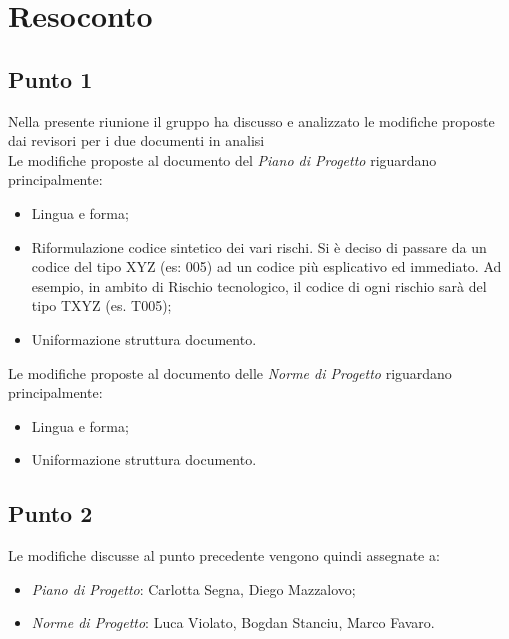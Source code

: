 \section{Resoconto}

\subsection{Punto 1}
Nella presente riunione il gruppo ha discusso e analizzato le modifiche proposte dai revisori per i due documenti in analisi\\
Le modifiche proposte al documento del \textit{Piano di Progetto} riguardano principalmente:
\begin{itemize}
	\item Lingua e forma;
	\item Riformulazione codice sintetico dei vari rischi. Si è deciso di passare da un codice del tipo XYZ (es: 005) ad un codice più esplicativo ed immediato. Ad esempio, in ambito di Rischio tecnologico, il codice di ogni rischio sarà del tipo TXYZ (es. T005);
	\item Uniformazione struttura documento.
\end{itemize}
Le modifiche proposte al documento delle \textit{Norme di Progetto} riguardano principalmente:
\begin{itemize}
	\item Lingua e forma;
	\item Uniformazione struttura documento.
\end{itemize}

\subsection{Punto 2}
Le modifiche discusse al punto precedente vengono quindi assegnate a:
\begin{itemize}
	\item \textit{Piano di Progetto}: Carlotta Segna, Diego Mazzalovo;
	\item \textit{Norme di Progetto}: Luca Violato, Bogdan Stanciu, Marco Favaro.
\end{itemize}

